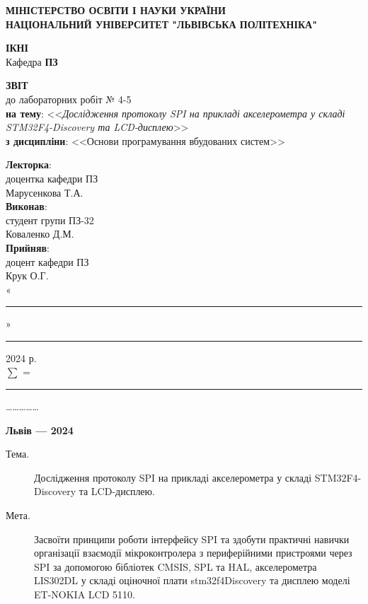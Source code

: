 \documentclass[oneside,14pt]{extarticle}
\newcommand\subject{Основи програмування вбудованих систем}
\newcommand\lecturer{доцентка кафедри ПЗ\\Марусенкова Т.А.}
\newcommand\teacher{доцент кафедри ПЗ\\Крук О.Г.}
\newcommand\mygroup{ПЗ-32}
\newcommand\lab{4-5}
\newcommand\theme{Дослідження протоколу SPI на прикладі акселерометра у складі STM32F4-Discovery та LCD-дисплею}
\newcommand\purpose{Засвоїти принципи роботи інтерфейсу SPI та здобути практичні навички організації взаємодії мікроконтролера з периферійними пристроями через SPI за допомогою бібліотек CMSIS, SPL та HAL, акселерометра LIS302DL у складі оціночної плати stm32f4Discovery та дисплею моделі ET-NOKIA LCD 5110}
\begin{document}
\begin{normalsize}
	\begin{titlepage}
		\thispagestyle{empty}
		\begin{center}
			\textbf{МІНІСТЕРСТВО ОСВІТИ І НАУКИ УКРАЇНИ\\
				НАЦІОНАЛЬНИЙ УНІВЕРСИТЕТ "ЛЬВІВСЬКА ПОЛІТЕХНІКА"}
		\end{center}
		\begin{flushright}
			\textbf{ІКНІ}\\
			Кафедра \textbf{ПЗ}
		\end{flushright}
		\vspace{80pt}
		\begin{center}
			\textbf{ЗВІТ}\\
			\vspace{10pt}
			до лабораторних робіт № \lab\\
			\textbf{на тему}: <<\textit{\theme}>>\\
			\textbf{з дисципліни}: <<\subject>>
		\end{center}
		\vspace{80pt}
		\begin{flushright}
			
			\textbf{Лекторка}:\\
			\lecturer\\
			\vspace{28pt}
			\textbf{Виконав}:\\
			
			студент групи \mygroup\\
			Коваленко Д.М.\\
			\vspace{28pt}
			\textbf{Прийняв}:\\
			
			\teacher\\
			
			\vspace{28pt}
			«\rule{1cm}{0.15mm}» \rule{1.5cm}{0.15mm} 2024 р.\\
			$\sum$ = \rule{1cm}{0.15mm}……………\\
			
		\end{flushright}
		\vspace{\fill}
		\begin{center}
			\textbf{Львів — 2024}
		\end{center}
	\end{titlepage}
		
	\begin{description}
		\item[Тема.] \theme.
		\item[Мета.] \purpose.
	\end{description}


\end{normalsize}
\end{document}
